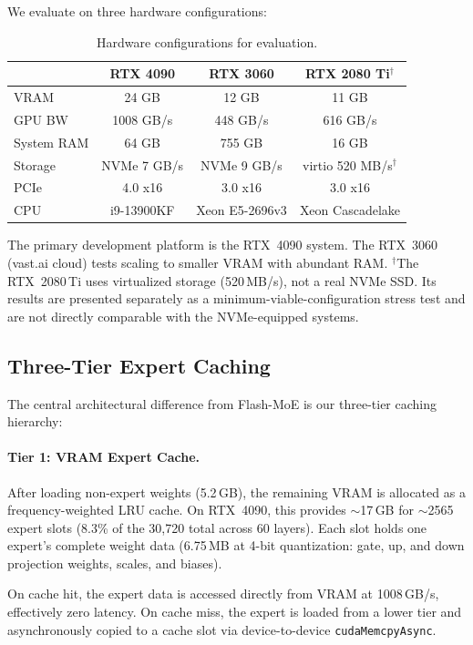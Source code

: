 \documentclass[10pt]{article}
\begin{document}
We evaluate on three hardware configurations:

\begin{table}[h]
\centering
\small
\caption{Hardware configurations for evaluation.}
\label{tab:hardware}
\begin{tabular}{lccc}
\toprule
& \textbf{RTX 4090} & \textbf{RTX 3060} & \textbf{RTX 2080 Ti}$^\dagger$ \\
\midrule
VRAM & 24 GB & 12 GB & 11 GB \\
GPU BW & 1008 GB/s & 448 GB/s & 616 GB/s \\
System RAM & 64 GB & 755 GB & 16 GB \\
Storage & NVMe 7 GB/s & NVMe 9 GB/s & virtio 520 MB/s$^\dagger$ \\
PCIe & 4.0 x16 & 3.0 x16 & 3.0 x16 \\
CPU & i9-13900KF & Xeon E5-2696v3 & Xeon Cascadelake \\
\bottomrule
\end{tabular}
\end{table}

The primary development platform is the RTX~4090 system. The RTX~3060 (vast.ai cloud) tests scaling to smaller VRAM with abundant RAM. $^\dagger$The RTX~2080\,Ti uses virtualized storage (520\,MB/s), not a real NVMe SSD. Its results are presented separately as a minimum-viable-configuration stress test and are not directly comparable with the NVMe-equipped systems.

\subsection{Three-Tier Expert Caching}
\label{sec:cache}

The central architectural difference from Flash-MoE is our three-tier caching hierarchy:

\paragraph{Tier 1: VRAM Expert Cache.}
After loading non-expert weights (5.2\,GB), the remaining VRAM is allocated as a frequency-weighted LRU cache. On RTX~4090, this provides $\sim$17\,GB for $\sim$2565 expert slots (8.3\% of the 30,720 total across 60 layers). Each slot holds one expert's complete weight data (6.75\,MB at 4-bit quantization: gate, up, and down projection weights, scales, and biases).

On cache hit, the expert data is accessed directly from VRAM at 1008\,GB/s, effectively zero latency. On cache miss, the expert is loaded from a lower tier and asynchronously copied to a cache slot via device-to-device \texttt{cudaMemcpyAsync}.
\end{document}
